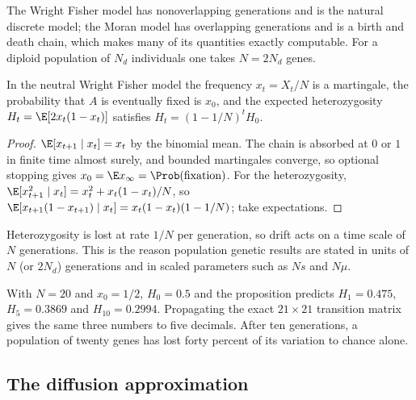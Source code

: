 The Wright Fisher model has nonoverlapping generations and is the natural discrete model; the
Moran model has overlapping generations and is a birth and death chain, which makes many of its
quantities exactly computable. For a diploid population of $N_d$ individuals one takes
$N=2N_d$ genes.

\begin{proposition}\label{toolkit:prop:drift}
In the neutral Wright Fisher model the frequency $x_t=X_t/N$ is a martingale, the probability that
$A$ is eventually fixed is $x_0$, and the expected heterozygosity $H_t=\E[2x_t(1-x_t)]$ satisfies
$H_t=(1-1/N)^tH_0$.
\end{proposition}

\begin{proof}
$\E[x_{t+1}\mid x_t]=x_t$ by the binomial mean. The chain is absorbed at $0$ or $1$ in finite time
almost surely, and bounded martingales converge, so optional stopping gives
$x_0=\E x_\infty=\Prob(\text{fixation})$. For the heterozygosity,
$\E[x_{t+1}^2\mid x_t]=x_t^2+x_t(1-x_t)/N$, so $\E[x_{t+1}(1-x_{t+1})\mid
x_t]=x_t(1-x_t)(1-1/N)$; take expectations.
\end{proof}

Heterozygosity is lost at rate $1/N$ per generation, so drift acts on a time scale of $N$
generations. This is the reason population genetic results are stated in units of $N$ (or $2N_d$)
generations and in scaled parameters such as $Ns$ and $N\mu$.

\begin{example}\label{toolkit:ex:het}
With $N=20$ and $x_0=1/2$, $H_0=0.5$ and the proposition predicts $H_1=0.475$,
$H_5=0.3869$ and $H_{10}=0.2994$. Propagating the exact $21\times21$ transition matrix gives the
same three numbers to five decimals. After ten generations, a population of twenty genes has
lost forty percent of its variation to chance alone.
\end{example}

\subsection{The diffusion approximation}\label{toolkit:sec:diffusion}

